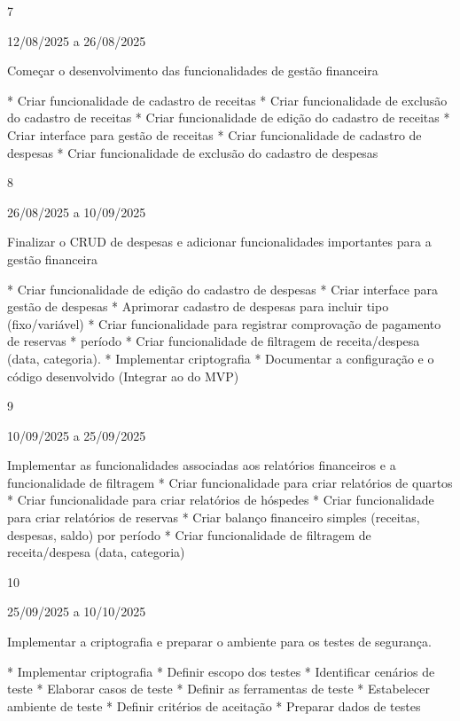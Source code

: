 7
	



12/08/2025 a 26/08/2025
	



Começar o desenvolvimento das funcionalidades de gestão financeira


	* Criar funcionalidade de cadastro de receitas
* Criar funcionalidade de exclusão do cadastro de receitas
* Criar funcionalidade de edição do cadastro de receitas
* Criar interface para gestão de receitas
* Criar funcionalidade de cadastro de despesas
* Criar funcionalidade de exclusão do cadastro de despesas
	









8
	



26/08/2025 a 10/09/2025
	

Finalizar o CRUD de despesas e adicionar funcionalidades importantes para a gestão financeira


	* Criar funcionalidade de edição do cadastro de despesas
* Criar interface para gestão de despesas
* Aprimorar cadastro de despesas para incluir tipo (fixo/variável)
* Criar funcionalidade para registrar comprovação de pagamento de reservas
* período
* Criar funcionalidade de filtragem de receita/despesa (data, categoria).
* Implementar criptografia 
* Documentar a configuração e o código desenvolvido (Integrar ao do MVP)
	





9
	



10/09/2025 a 25/09/2025
	

Implementar as funcionalidades associadas aos relatórios financeiros e a funcionalidade de filtragem
	* Criar funcionalidade para criar relatórios de quartos
* Criar funcionalidade para criar relatórios de hóspedes
* Criar funcionalidade para criar relatórios de reservas
* Criar balanço financeiro simples (receitas, despesas, saldo) por período
* Criar funcionalidade de filtragem de receita/despesa (data, categoria)
	



10
	

25/09/2025 a 10/10/2025
	

Implementar a criptografia e preparar o ambiente para os testes de segurança.
	

* Implementar criptografia
* Definir escopo dos testes
* Identificar cenários de teste
* Elaborar casos de teste
* Definir as ferramentas de teste
* Estabelecer ambiente de teste
* Definir critérios de aceitação
* Preparar dados de testes
	





